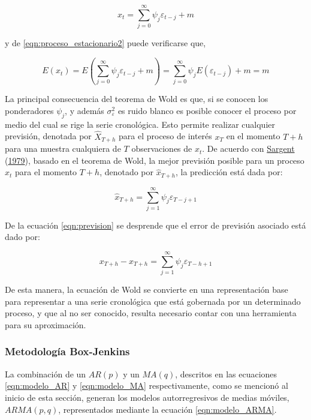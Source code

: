 \documentclass[
]{article}
\begin{document}
\begin{equation}
\label{eqn:proceso_estacionario2}
x_t=\sum_{j=0}^{\infty} \psi_j\varepsilon_{t-j}+m
\end{equation}

y de \ref{eqn:proceso_estacionario2} puede verificarse que,

\begin{equation}
\label{eqn:dem_proceso_estacionario2}
E(x_t)=E\left(\sum_{j=0}^{\infty} \psi_j\varepsilon_{t-j}+m\right)=\sum_{j=0}^{\infty} \psi_jE\left(\varepsilon_{t-j}\right) + m = m
\end{equation}

La principal consecuencia del teorema de Wold es que, si se conocen los
ponderadores \(\psi_j\), y además \(\sigma_\varepsilon^2\) es ruido
blanco es posible conocer el proceso por medio del cual se rige la serie
cronológica. Esto permite realizar cualquier previsión, denotada por
\(\hat X_{T+h}\) para el proceso de interés \(x_T\) en el momento
\(T+h\) para una muestra cualquiera de \(T\) observaciones de \(x_t\).
De acuerdo con \protect\hyperlink{ref-sargent_macro}{Sargent}
(\protect\hyperlink{ref-sargent_macro}{1979}), basado en el teorema de
Wold, la mejor previsión posible para un proceso \(x_t\) para el momento
\(T+h\), denotado por \(\hat x_{T+h}\), la predicción está dada por:

\begin{equation}
\label{eqn:prevision}
\hat x_{T+h}=\sum_{j=1}^{\infty} \psi_j \varepsilon_{T-j+1}
\end{equation}

De la ecuación \ref{eqn:prevision} se desprende que el error de
previsión asociado está dado por:

\begin{equation}
\label{eqn:error_prevision}
x_{T+h}- \hat x_{T+h}=\sum_{j=1}^{\infty} \psi_j \varepsilon_{T-h+1}
\end{equation}

De esta manera, la ecuación de Wold se convierte en una representación
base para representar a una serie cronológica que está gobernada por un
determinado proceso, y que al no ser conocido, resulta necesario contar
con una herramienta para su aproximación.

\subsubsection{Metodología Box-Jenkins}

La combinación de un \(AR(p)\) y un \(MA(q)\), descritos en las
ecuaciones \ref{eqn:modelo_AR} y \ref{eqn:modelo_MA} respectivamente,
como se mencionó al inicio de esta sección, generan los modelos
autorregresivos de medias móviles, \(ARMA(p,q)\), representados mediante
la ecuación \ref{eqn:modelo_ARMA}.
\end{document}
